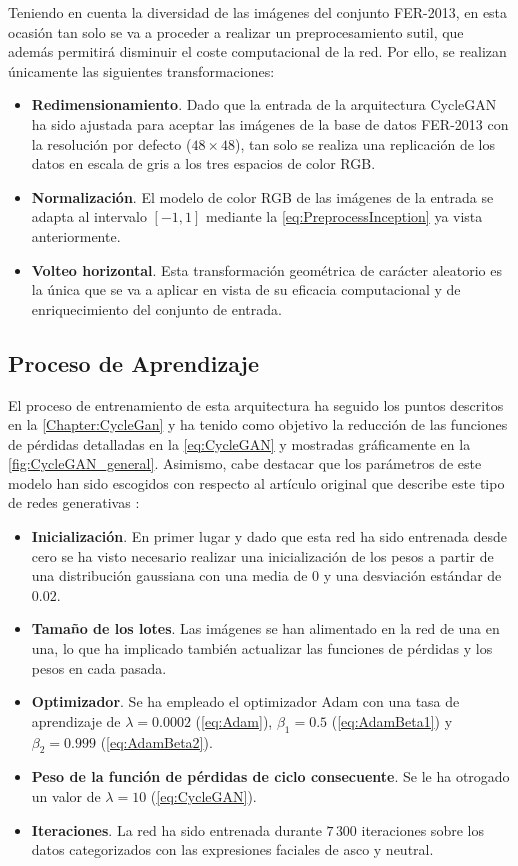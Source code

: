 Teniendo en cuenta la diversidad de las imágenes del conjunto FER-2013, en esta ocasión tan solo se va a proceder a realizar un preprocesamiento sutil, que además permitirá disminuir el coste computacional de la red. Por ello, se realizan únicamente las siguientes transformaciones:
\begin{itemize}
    \item \textbf{Redimensionamiento}. Dado que la entrada de la arquitectura CycleGAN ha sido ajustada para aceptar las imágenes de la base de datos FER-2013 con la resolución por defecto ($48 \times 48$), tan solo se realiza una replicación de los datos en escala de gris a los tres espacios de color RGB.
    \item \textbf{Normalización}. El modelo de color RGB de las imágenes de la entrada se adapta al intervalo $[-1, 1]$ mediante la \autoref{eq:PreprocessInception} ya vista anteriormente.
    \item \textbf{Volteo horizontal}. Esta transformación geométrica de carácter aleatorio es la única que se va a aplicar en vista de su eficacia computacional y de enriquecimiento del conjunto de entrada.
\end{itemize}

\subsection{Proceso de Aprendizaje}

El proceso de entrenamiento de esta arquitectura ha seguido los puntos descritos en la \autoref{Chapter:CycleGan} y ha tenido como objetivo la reducción de las funciones de pérdidas detalladas en la \autoref{eq:CycleGAN} y mostradas gráficamente en la \autoref{fig:CycleGAN_general}. Asimismo, cabe destacar que los parámetros de este modelo han sido escogidos con respecto al artículo original que describe este tipo de redes generativas \cite{cycleGAN}:
\begin{itemize}
    \item \textbf{Inicialización}. En primer lugar y dado que esta red ha sido entrenada desde cero se ha visto necesario realizar una inicialización de los pesos a partir de una distribución gaussiana con una media de $0$ y una desviación estándar de $0.02$. 
    \item \textbf{Tamaño de los lotes}. Las imágenes se han alimentado en la red de una en una, lo que ha implicado también actualizar las funciones de pérdidas y los pesos en cada pasada.
    \item \textbf{Optimizador}. Se ha empleado el optimizador Adam con una tasa de aprendizaje de $ \lambda = 0.0002$ (\autoref{eq:Adam}), $\beta_1 = 0.5$ (\autoref{eq:AdamBeta1}) y $\beta_2 = 0.999$ (\autoref{eq:AdamBeta2}).
    \item \textbf{Peso de la función de pérdidas de ciclo consecuente}. Se le ha otrogado un valor de $\lambda = 10$ (\autoref{eq:CycleGAN}).
    \item \textbf{Iteraciones}. La red ha sido entrenada durante $7\,300$ iteraciones sobre los datos categorizados con las expresiones faciales de asco y neutral.
\end{itemize}

